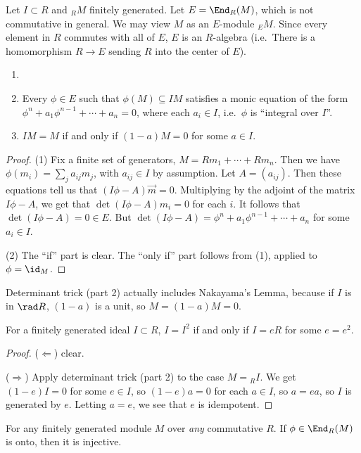  Let $I\subset R$ and ${}_R M$ finitely generated. Let
 $E=\End_R (M)$, which is not commutative in general. We may view $M$ as an $E$-module
 ${}_E M$. Since every element in $R$ commutes with all of $E$, $E$ is an $R$-algebra (i.e.\
 There is a homomorphism $R\to E$ sending $R$ into the center of $E$).
 \begin{lemma}
  \begin{enumerate}\item[]
    \item Every $\phi\in E$ such that $\phi(M)\subseteq IM$ satisfies a monic equation
    of the form $\phi^n+a_1\phi^{n-1} +\cdots + a_n=0$, where each $a_i\in I$, i.e.\
    $\phi$ is ``integral over $I$''.

    \item $IM=M$ if and only if $(1-a)M=0$ for some $a\in I$.
  \end{enumerate}
 \end{lemma}
 \begin{proof}
   (1) Fix a finite set of generators, $M=Rm_1+\cdots + Rm_n$. Then we have
   $\phi(m_i)=\sum_j a_{ij} m_j$, with $a_{ij}\in I$ by assumption. Let $A=(a_{ij})$.
   Then these equations tell us that $(I\phi-A)\vec{m}=0$. Multiplying by the adjoint of
   the matrix $I\phi-A$, we get that $\det(I\phi-A)m_i=0$ for each $i$. It follows that
   $\det(I\phi-A)=0\in E$. But $\det(I\phi-A)=\phi^n+a_1\phi^{n-1}+\cdots +a_n$ for some
   $a_i\in I$.

   (2) The ``if'' part is clear. The ``only if'' part follows from (1), applied to
   $\phi=\id_M$.
 \end{proof}
 \begin{remark}
   Determinant trick (part 2) actually includes Nakayama's Lemma, because if $I$ is in
   $\rad R$, $(1-a)$ is a unit, so $M=(1-a)M=0$.
 \end{remark}
 \begin{corollary}
   For a finitely generated ideal $I\subset R$, $I=I^2$ if and only if $I=eR$ for some
   $e=e^2$.
 \end{corollary}
 \begin{proof}
   ($\Leftarrow$) clear.

   ($\Rightarrow$) Apply determinant trick (part 2) to the case $M={}_R I$. We get
   $(1-e)I=0$ for some $e\in I$, so $(1-e)a=0$ for each $a\in I$, so $a=ea$, so $I$ is
   generated by $e$. Letting $a=e$, we see that $e$ is idempotent.
 \end{proof}
 \begin{corollary}
   For any finitely generated module $M$ over \emph{any} commutative $R$. If $\phi\in
   \End_R(M)$ is onto, then it is injective.
 \end{corollary}
